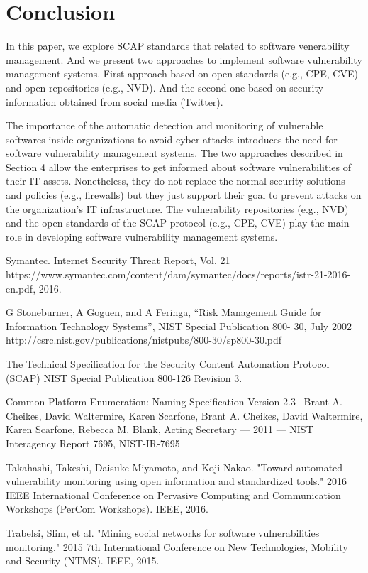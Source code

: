 \documentclass{llncs}
\begin{document}
\section{Conclusion}
In this paper, we explore SCAP standards that related to software venerability management. And we present two approaches to implement software vulnerability management systems. First approach based on open standards (e.g., CPE, CVE) and open repositories (e.g., NVD). And the second one based on  security information obtained from social media (Twitter).  
\par The importance of the automatic detection and monitoring of vulnerable softwares inside organizations to avoid cyber-attacks introduces the need for software vulnerability management systems. The two approaches described in Section 4 allow the enterprises to get informed about software vulnerabilities of their IT assets. Nonetheless, they do not replace the normal security solutions and policies (e.g., firewalls) but they just support their goal to prevent attacks on the organization's IT infrastructure. The vulnerability repositories (e.g., NVD) and the open standards of the SCAP protocol (e.g., CPE, CVE) play the main role in developing software vulnerability management systems.   



\begin{thebibliography}{[MT1]}

%


Symantec. Internet Security Threat Report, Vol. 21 https://www.symantec.com/content/dam/symantec/docs/reports/istr-21-2016-en.pdf, 2016.

G Stoneburner, A Goguen, and A Feringa, “Risk Management Guide
for Information Technology Systems”, NIST Special Publication 800-
30, July 2002
http://csrc.nist.gov/publications/nistpubs/800-30/sp800-30.pdf

The Technical Specification for the
Security Content Automation Protocol (SCAP)
NIST Special Publication 800-126
Revision 3.

Common Platform Enumeration: Naming Specification Version 2.3 –Brant A. Cheikes, David Waltermire, Karen Scarfone, Brant A. Cheikes, David Waltermire, Karen Scarfone, Rebecca M. Blank, Acting Secretary — 2011 — NIST Interagency Report 7695, NIST-IR-7695

Takahashi, Takeshi, Daisuke Miyamoto, and Koji Nakao. "Toward automated vulnerability monitoring using open information and standardized tools." 2016 IEEE International Conference on Pervasive Computing and Communication Workshops (PerCom Workshops). IEEE, 2016.

Trabelsi, Slim, et al. "Mining social networks for software vulnerabilities monitoring." 2015 7th International Conference on New Technologies, Mobility and Security (NTMS). IEEE, 2015.
%
\end{thebibliography}
\end{document}
